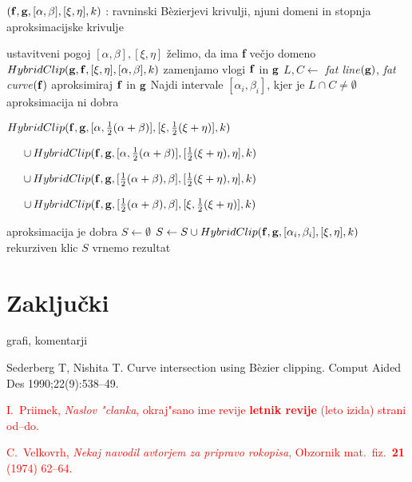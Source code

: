 \documentclass[12pt,a4paper, reqno]{amsart}
\begin{document}
\begin{small}
   \begin{algorithmic}[1]
	\Require $({\bf f},{\bf g}, [\alpha,\beta], [\xi,\eta], k)$ : ravninski B\`{e}zierjevi krivulji, njuni domeni in stopnja aproksimacijske krivulje

	 \hfill ustavitveni pogoj
		\State \Return $[\alpha,\beta],[\xi,\eta]$
	\Else
		\If{$|\alpha - \beta | < |\xi - \eta|$} \hfill želimo, da ima {\bf f} večjo domeno
			\State $HybridClip( {\bf g}, {\bf f}, [\xi,\eta],[\alpha,\beta],k)$ 
			\hfill zamenjamo vlogi ${\bf f}$ in ${\bf g}$
		\Else
			\State $L, C \gets $ {\em fat line}$({\bf g})$, {\em fat curve}$({\bf f})$ 
			\hfill aproksimiraj ${\bf f}$ in ${\bf g}$
			\State Najdi intervale $[\alpha _i,\beta _i]$, kjer je $L\cap C\neq \emptyset$
			 \hfill  aproksimacija ni dobra
				\State \Return \begin{varwidth}[t]{\linewidth}  
					$HybridClip({\bf f},{\bf g},[\alpha,\frac{1}{2}(\alpha+\beta)],[\xi,\frac{1}{2}(\xi+\eta)],k)$\par $ 
        \hskip\algorithmicindent
					\cup \, HybridClip({\bf f},{\bf g},[\alpha,\frac{1}{2}(\alpha+\beta)],[\frac{1}{2}(\xi+\eta), \eta],k)$\par$
        \hskip\algorithmicindent
					\cup \, HybridClip({\bf f},{\bf g},[\frac{1}{2}(\alpha+\beta), \beta],[\frac{1}{2}(\xi+\eta), \eta],k)$\par$
        \hskip\algorithmicindent
					\cup \, HybridClip({\bf f},{\bf g},[\frac{1}{2}(\alpha+\beta), \beta],[\xi, \frac{1}{2}(\xi+\eta)],k)$
					\end{varwidth}
			\Else \hfill  aproksimacija je dobra
				\State $S\gets \emptyset$
					\State $S\gets S\cup HybridClip({\bf f},{\bf g},[\alpha _i,\beta _i], [\xi,\eta],k)$
					\hfill rekurziven klic
				\EndFor
				\State \Return $S$ \hfill vrnemo rezultat
			\EndIf
		\EndIf
	\EndIf
   \end{algorithmic}
\end{small}



\section{Zaključki}
grafi, komentarji
\begin{thebibliography}{99}

 Sederberg T, Nishita T. Curve intersection using B\`{e}zier clipping. Comput
Aided Des 1990;22(9):538--49.

\textcolor{Red}{I.~Priimek, {\em Naslov "clanka}, okraj"sano ime revije {\bf letnik revije} (leto izida) strani od--do.}

\textcolor{Red}{C.~Velkovrh, {\em Nekaj navodil avtorjem za pripravo rokopisa}, Obzornik mat.\ fiz.\ {\bf 21} (1974) 62--64.}

\end{thebibliography}
\end{document}
